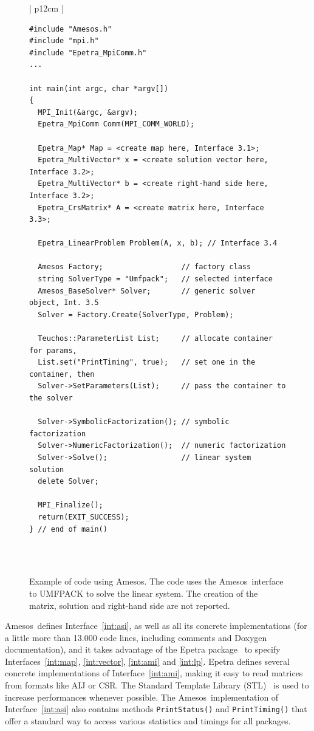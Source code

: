 \documentclass[acmtocl]{acmtrans2m}
\newcommand{\amesos}{{\sc Amesos}}
\begin{document}
\begin{figure}
\begin{center}
\begin{tabular}{| p{12cm} | }
\hline
 \\
\begin{minipage}{12cm}
\begin{verbatim}
#include "Amesos.h"
#include "mpi.h"
#include "Epetra_MpiComm.h"
...

int main(int argc, char *argv[]) 
{
  MPI_Init(&argc, &argv);
  Epetra_MpiComm Comm(MPI_COMM_WORLD);

  Epetra_Map* Map = <create map here, Interface 3.1>;
  Epetra_MultiVector* x = <create solution vector here, Interface 3.2>;
  Epetra_MultiVector* b = <create right-hand side here, Interface 3.2>; 
  Epetra_CrsMatrix* A = <create matrix here, Interface 3.3>;

  Epetra_LinearProblem Problem(A, x, b); // Interface 3.4

  Amesos Factory;                  // factory class
  string SolverType = "Umfpack";   // selected interface
  Amesos_BaseSolver* Solver;       // generic solver object, Int. 3.5
  Solver = Factory.Create(SolverType, Problem);

  Teuchos::ParameterList List;     // allocate container for params,
  List.set("PrintTiming", true);   // set one in the container, then
  Solver->SetParameters(List);     // pass the container to the solver

  Solver->SymbolicFactorization(); // symbolic factorization
  Solver->NumericFactorization();  // numeric factorization
  Solver->Solve();                 // linear system solution
  delete Solver;
    
  MPI_Finalize();
  return(EXIT_SUCCESS);
} // end of main()
\end{verbatim}
\end{minipage} \\
 \\
 \hline
\end{tabular}
\caption{Example of code using \amesos. The code uses the \amesos\ interface to
  UMFPACK to solve the linear system. The creation of the matrix, solution and
    right-hand side are not reported.}
\label{fig:example}
\end{center}
\end{figure}

\amesos\ defines Interface~\ref{int:asi}, as well as all its concrete
implementations (for a little more than 13.000 code lines, including comments
                 and Doxygen documentation), and it
takes advantage of the {\sc Epetra} package~\cite{Epetra-Ref-Guide} to specify
Interfaces~\ref{int:map}, \ref{int:vector}, \ref{int:ami} and \ref{int:lp}.
{\sc Epetra} defines several concrete implementations of
Interface~\ref{int:ami}, making it easy to read matrices from formats
  like AIJ or CSR.
The Standard Template Library (STL)~\cite{wise96overview} is used
to increase performances whenever possible.
The \amesos\ implementation of Interface~\ref{int:asi} also contains methods
{\tt PrintStatus()} and {\tt PrintTiming()} that offer a standard way to
access various statistics and timings for all packages.
\end{document}
